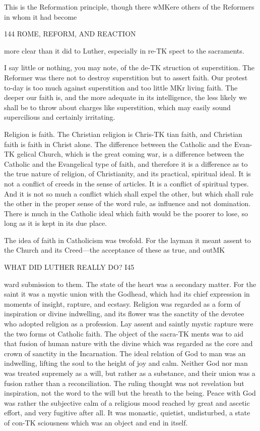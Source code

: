 \documentclass[12pt,a5paper,oneside]{book}
\begin{document}
{This is the Reformation principle, though there 
wMKere others of the Reformers in whom it had become 



144 ROME, REFORM, AND REACTION 

more clear than it did to Luther, especially in re-TK
spect to the sacraments. 

I say little or nothing, you may note, of the de-TK
struction ot superstition. The Reformer was there 
not to destroy superstition but to assert faith. Our 
protest to-day is too much against superstition and too 
little MKr living faith. The deeper our faith is, and the 
more adequate in its intelligence, the less likely we 
shall be to throw about charges like superstition, which 
may easily sound supercilious and certainly irritating. 

Religion is faith. The Christian religion is Chris-TK
tian faith, and Christian faith is faith in Christ alone. 
The difference between the Catholic and the Evan-TK
gelical Church, which is the great coming war, is a 
difference between the Catholic and the Evangelical 
type of faith, and therefore it is a difference as to the 
true nature of religion, of Christianity, and its practical, 
spiritual ideal. It is not a conflict of creeds in the 
sense of articles. It is a conflict of spiritual types. And 
it is not so much a conflict which shall expel the other, 
but which shall rule the other in the proper sense of 
the word rule, as influence and not domination. There 
is much in the Catholic ideal which faith would be the 
poorer to lose, so long as it is kept in its due place. 

The idea of faith in Catholicism was twofold. 
For the layman it meant assent to the Church and 
its Creed---the acceptance of these as true, and outMK 



WHAT DID LUTHER REALLY DO? I45 

ward submission to them. The state of the heart 
was a secondary matter. For the saint it was a 
mystic union with the Godhead, which had its chief 
expression in moments of insight, rapture, and ecstasy. 
Religion was regarded as a form of inspiration or 
divine indwelling, and its flower was the sanctity of 
the devotee who adopted religion as a profession. 
Lay assent and saintly mystic rapture were the two 
forms ot Catholic faith. The object of the sacra-TK
ments was to aid that fusion of human nature with 
the divine which was regarded as the core and 
crown of sanctity in the Incarnation. The ideal 
relation of God to man was an indwelling, lifting 
the soul to the height of joy and calm. Neither God 
nor man was treated supremely as a will, but rather 
as a substance, and their union was a fusion rather 
than a reconciliation. The ruling thought was not 
revelation but inspiration, not the word to the will 
but the breath to the being. Peace with God was 
rather the subjective calm of a religious mood reached 
by great and ascetic effort, and very fugitive after all. 
It was monastic, quietist, undisturbed, a state of con-TK
sciousness which was an object and end in itself. 

}
\end{document}
